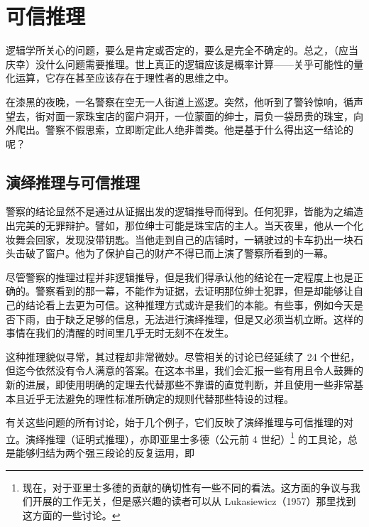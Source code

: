 \chapter[plausible-reasoning]{可信推理}

\startdictum
逻辑学所关心的问题，要么是肯定或否定的，要么是完全不确定的。总之，（应当庆幸）没什么问题需要推理。世上真正的逻辑应该是概率计算——关乎可能性的量化运算，它存在甚至应该存在于理性者的思维之中。
  
\stopdictum

在漆黑的夜晚，一名警察在空无一人街道上巡逻。突然，他听到了警铃惊响，循声望去，街对面一家珠宝店的窗户洞开，一位蒙面的绅士，肩负一袋昂贵的珠宝，向外爬出。警察不假思索，立即断定此人绝非善类。他是基于什么得出这一结论的呢？

\section{演绎推理与可信推理}

警察的结论显然不是通过从证据出发的逻辑推导而得到。任何犯罪，皆能为之编造出完美的无罪辩护。譬如，那位绅士可能是珠宝店的主人。当天夜里，他从一个化妆舞会回家，发现没带钥匙。当他走到自己的店铺时，一辆驶过的卡车扔出一块石头击破了窗户。他为了保护自己的财产不得已而上演了警察所看到的一幕。

尽管警察的推理过程并非逻辑推导，但是我们得承认他的结论在一定程度上也是正确的。警察看到的那一幕，不能作为证据，去证明那位绅士犯罪，但是却能够让自己的结论看上去更为可信。这种推理方式或许是我们的本能。有些事，例如今天是否下雨，由于缺乏足够的信息，无法进行演绎推理，但是又必须当机立断。这样的事情在我们的清醒的时间里几乎无时无刻不在发生。

这种推理貌似寻常，其过程却非常微妙。尽管相关的讨论已经延续了 24 个世纪，但迄今依然没有令人满意的答案。在这本书里，我们会汇报一些有用且令人鼓舞的新的进展，即使用明确的定理去代替那些不靠谱的直觉判断，并且使用一些非常基本且近乎无法避免的理性标准所确定的规则代替那些特设的过程。

有关这些问题的所有讨论，始于几个例子，它们反映了演绎推理与可信推理的对立。演绎推理（证明式推理），亦即亚里士多德（公元前 4 世纪）\footnote{现在，对于亚里士多德的贡献的确切性有一些不同的看法。这方面的争议与我们开展的工作无关，但是感兴趣的读者可以从 Lukasiewicz（1957）那里找到这方面的一些讨论。} 的工具论，总是能够归结为两个强三段论的反复运用，即

\placeformula[syllogism-1]
\startformula
{}
\stopformula

